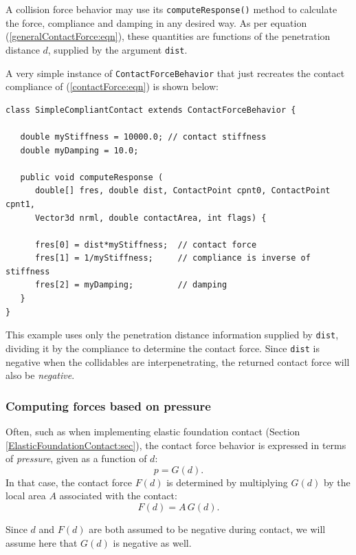A collision force behavior may use its {\tt computeResponse()} method
to calculate the force, compliance and damping in any desired way. As
per equation (\ref{generalContactForce:eqn}), these quantities are
functions of the penetration distance $d$, supplied by the argument
{\tt dist}.

A very simple instance of {\tt ContactForceBehavior} that just
recreates the contact compliance of (\ref{contactForce:eqn})
is shown below:
%
\begin{lstlisting}[]
class SimpleCompliantContact extends ContactForceBehavior {

   double myStiffness = 10000.0; // contact stiffness
   double myDamping = 10.0;

   public void computeResponse (
      double[] fres, double dist, ContactPoint cpnt0, ContactPoint cpnt1, 
      Vector3d nrml, double contactArea, int flags) {

      fres[0] = dist*myStiffness;  // contact force
      fres[1] = 1/myStiffness;     // compliance is inverse of stiffness
      fres[2] = myDamping;         // damping
   }
}
\end{lstlisting}
%
This example uses only the penetration distance information supplied
by {\tt dist}, dividing it by the compliance to determine the contact
force. Since {\tt dist} is negative when the collidables are
interpenetrating, the returned contact force will also be {\it
negative}.

\subsubsection{Computing forces based on pressure}
\label{pressureBasedContact:sec}

Often, such as when implementing elastic foundation contact
(Section \ref{ElasticFoundationContact:sec}), the contact force
behavior is expressed in terms of {\it pressure}, given as a
function of $d$:
%
\begin{equation}
p = G (d).
\end{equation}
%
In that case, the contact force $F(d)$ is determined by multiplying
$G(d)$ by the local area $A$ associated with the contact:
%
\begin{equation}
F(d) = A \, G(d).
\end{equation}
%
\begin{sideblock}
Since $d$ and $F(d)$ are both assumed to be negative during contact,
we will assume here that $G(d)$ is negative as well.
\end{sideblock}

